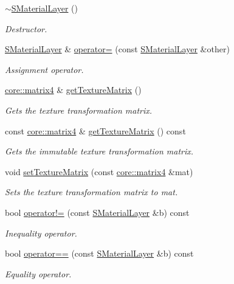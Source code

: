 \begin{DoxyCompactItemize}
\hyperlink{classirr_1_1video_1_1SMaterialLayer_a3a95dd1993dcc1f2d4bf873602b49b4e}{$\sim$\+S\+Material\+Layer} ()
\begin{DoxyCompactList}\small\item\em Destructor. \end{DoxyCompactList}\item 
\hyperlink{classirr_1_1video_1_1SMaterialLayer}{S\+Material\+Layer} \& \hyperlink{classirr_1_1video_1_1SMaterialLayer_a94f5f3af3cd4ded545779e1942c63734}{operator=} (const \hyperlink{classirr_1_1video_1_1SMaterialLayer}{S\+Material\+Layer} \&other)
\begin{DoxyCompactList}\small\item\em Assignment operator. \end{DoxyCompactList}\item 
\hyperlink{namespaceirr_1_1core_a4c9d4e29899535971052810954a14431}{core\+::matrix4} \& \hyperlink{classirr_1_1video_1_1SMaterialLayer_aa8d7c025f5bb282537b8886c340dbe63}{get\+Texture\+Matrix} ()
\begin{DoxyCompactList}\small\item\em Gets the texture transformation matrix. \end{DoxyCompactList}\item 
const \hyperlink{namespaceirr_1_1core_a4c9d4e29899535971052810954a14431}{core\+::matrix4} \& \hyperlink{classirr_1_1video_1_1SMaterialLayer_a81072348510d63fcc11134ae7471c5f7}{get\+Texture\+Matrix} () const
\begin{DoxyCompactList}\small\item\em Gets the immutable texture transformation matrix. \end{DoxyCompactList}\item 
void \hyperlink{classirr_1_1video_1_1SMaterialLayer_a0f84f47351a17b2a6041688a425fda1a}{set\+Texture\+Matrix} (const \hyperlink{namespaceirr_1_1core_a4c9d4e29899535971052810954a14431}{core\+::matrix4} \&mat)
\begin{DoxyCompactList}\small\item\em Sets the texture transformation matrix to mat. \end{DoxyCompactList}\item 
bool \hyperlink{classirr_1_1video_1_1SMaterialLayer_a2d379f02b6a06600df2b0eaf252c8f71}{operator!=} (const \hyperlink{classirr_1_1video_1_1SMaterialLayer}{S\+Material\+Layer} \&b) const
\begin{DoxyCompactList}\small\item\em Inequality operator. \end{DoxyCompactList}\item 
bool \hyperlink{classirr_1_1video_1_1SMaterialLayer_a0c342c76ebd572bba7ae0922a22dadb7}{operator==} (const \hyperlink{classirr_1_1video_1_1SMaterialLayer}{S\+Material\+Layer} \&b) const
\begin{DoxyCompactList}\small\item\em Equality operator. \end{DoxyCompactList}\end{DoxyCompactItemize}
